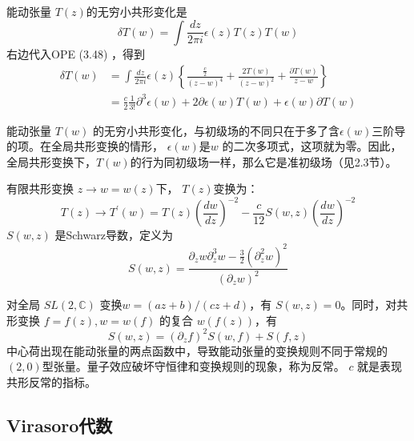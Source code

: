 能动张量 $T(z) $的无穷小共形变化是
\begin{equation}
	\delta T(w)=\int \frac{d z}{2 \pi i} \epsilon(z) T(z) T(w)
\end{equation}
右边代入OPE (3.48) ，得到
\begin{equation}
	\begin{aligned} \delta T(w) &=\int \frac{d z}{2 \pi i} \epsilon(z)\left\{\frac{\frac{c}{2}}{(z-w)^{4}}+\frac{2 T(w)}{(z-w)^{2}}+\frac{\partial T(w)}{z-w}\right\} \\ &=\frac{c}{2} \frac{1}{3 !} \partial^{3} \epsilon(w)+2 \partial \epsilon(w) T(w)+\epsilon(w) \partial T(w) \end{aligned}
\end{equation}

能动张量 $T(w)$ 的无穷小共形变化，与初级场的不同只在于多了含$ \epsilon(w) $三阶导的项。在全局共形变换的情形， $\epsilon(w) $是$ w$ 的二次多项式，这项就为零。因此，全局共形变换下，$ T(w) $的行为同初级场一样，那么它是准初级场（见2.3节）。

有限共形变换 $z \rightarrow w=w(z) $下， $T(z) $变换为：
\begin{equation}
	T(z) \rightarrow T^{\prime}(w)=T(z)\left(\frac{d w}{d z}\right)^{-2}-\frac{c}{12} S(w, z)\left(\frac{d w}{d z}\right)^{-2}
\end{equation}
$S(w,z)$ 是Schwarz导数，定义为
\begin{equation}
	S(w, z)=\frac{\partial_{z} w \partial_{z}^{3} w-\frac{3}{2}\left(\partial_{z}^{2} w\right)^{2}}{\left(\partial_{z} w\right)^{2}}
\end{equation}

对全局 $SL(2,\mathbb{C})$ 变换$ w=(az+b)/(cz+d) $，有 $S(w,z)=0 $。同时，对共形变换 $f=f(z),w=w(f)$ 的复合 $w(f(z)) $，有
\begin{equation}
	S(w, z)=\left(\partial_{z} f\right)^{2} S(w, f)+S(f, z)
\end{equation}
中心荷出现在能动张量的两点函数中，导致能动张量的变换规则不同于常规的 $(2,0) $型张量。量子效应破坏守恒律和变换规则的现象，称为反常。 $c$ 就是表现共形反常的指标。

\subsection{ Virasoro代数}

